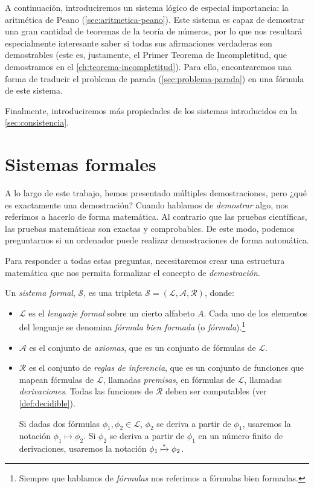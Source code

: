 A continuación, introduciremos un sistema lógico de especial importancia: la aritmética de Peano (\cref{sec:aritmetica-peano}). Este sistema es capaz de demostrar una gran cantidad de teoremas de la teoría de números, por lo que nos resultará especialmente interesante saber si todas sus afirmaciones verdaderas son demostrables (este es, justamente, el Primer Teorema de Incompletitud, que demostramos en el \cref{ch:teorema-incompletitud}). Para ello, encontraremos una forma de traducir el problema de parada (\cref{sec:problema-parada}) en una fórmula de este sistema.

Finalmente, introduciremos más propiedades de los sistemas introducidos en la \cref{sec:consistencia}.

\section{Sistemas formales}\label{sec:sistemas-formales}

A lo largo de este trabajo, hemos presentado múltiples demostraciones, pero ¿qué es exactamente una demostración? Cuando hablamos de \emph{demostrar} algo, nos referimos a hacerlo de forma matemática. Al contrario que las pruebas científicas, las pruebas matemáticas son exactas y comprobables. De este modo, podemos preguntarnos si un ordenador puede realizar demostraciones de forma automática.

Para responder a todas estas preguntas, necesitaremos crear una estructura matemática que nos permita formalizar el concepto de \emph{demostración}.

\begin{definicion}\label{def:sistema-formal}
Un \emph{sistema formal}, $\mathcal{S}$, es una tripleta $\mathcal{S} = (\mathcal{L}, \mathcal{A}, \mathcal{R})$, donde:
\begin{itemize}
    \item $\mathcal{L}$ es el \emph{lenguaje formal} sobre un cierto alfabeto $A$. Cada uno de los elementos del lenguaje se denomina \emph{fórmula bien formada} (o \emph{fórmula}).\footnote{Siempre que hablamos de \emph{fórmulas} nos referimos a fórmulas bien formadas.}
    \item $\mathcal{A}$ es el conjunto de \emph{axiomas}, que es un conjunto de fórmulas de $\mathcal{L}$.
    \item $\mathcal{R}$ es el conjunto de \emph{reglas de inferencia}, que es un conjunto de funciones que mapean fórmulas de $\mathcal{L}$, llamadas \emph{premisas}, en fórmulas de $\mathcal{L}$, llamadas \emph{derivaciones}. Todas las funciones de $\mathcal{R}$ deben ser computables (ver \cref{def:decidible}).

    Si dadas dos fórmulas $\phi_1, \phi_2\in\mathcal{L}$, $\phi_2$ se deriva a partir de $\phi_1$, usaremos la notación $\phi_1 \mapsto \phi_2$. Si $\phi_2$ se deriva a partir de $\phi_1$ en un número finito de derivaciones, usaremos la notación $\phi_1 \xmapsto{*}\phi_2$.
\end{itemize}
\end{definicion}

